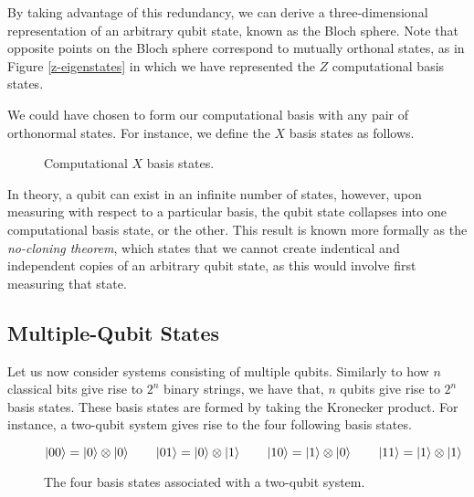By taking advantage of this redundancy, we can derive a three-dimensional representation of an arbitrary qubit state, known as the Bloch sphere. Note that opposite points on the Bloch sphere correspond to mutually orthonal states, as in Figure \ref{z-eigenstates} in which we have represented the $Z$ computational basis states.

We could have chosen to form our computational basis with any pair of orthonormal states. For instance, we define the $X$ basis states as follows.

\begin{figure}[H]
    \centering
    \begin{minipage}{.45\textwidth}
        \centering
    \end{minipage}%
    \begin{minipage}{0.45\textwidth}
        \centering
    \end{minipage}
    \caption{Computational $X$ basis states.}
    \label{x-eigenstates}
\end{figure}

In theory, a qubit can exist in an infinite number of states, however, upon measuring with respect to a particular basis, the qubit state collapses into one computational basis state, or the other. This result is known more formally as the \textit{no-cloning theorem}, which states that we cannot create indentical and independent copies of an arbitrary qubit state, as this would involve first measuring that state.

\subsection{Multiple-Qubit States}

Let us now consider systems consisting of multiple qubits. Similarly to how $n$ classical bits give rise to $2^n$ binary strings, we have that, $n$ qubits give rise to $2^n$ basis states. These basis states are formed by taking the Kronecker product. For instance, a two-qubit system gives rise to the four following basis states.

\begin{figure}[H]
    \centering
    \begin{equation*}
        \ket{00} = \ket 0 \otimes \ket 0 \qquad
        \ket{01} = \ket 0 \otimes \ket 1 \qquad
        \ket{10} = \ket 1 \otimes \ket 0 \qquad
        \ket{11} = \ket 1 \otimes \ket 1
    \end{equation*}
    \caption{The four basis states associated with a two-qubit system.}
    \label{two-qubit-states}
\end{figure}

